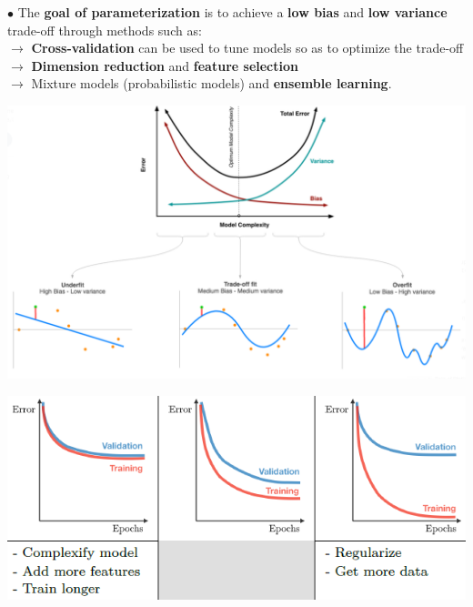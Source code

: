 \documentclass[letterpaper, 10.5pt,landscape]{article}
\begin{document}
\begin{multicols*}{3}
$\bullet$ The \textbf{goal of parameterization} is to achieve a \textbf{low bias} and \textbf{low variance} trade-off through methods such as:\\
$\rightarrow$ \textbf{Cross-validation} can be used to tune models so as to optimize the trade-off \\
$\rightarrow$ \textbf{Dimension reduction} and \textbf{feature selection} \\
$\rightarrow$ Mixture models (probabilistic models) and \textbf{ensemble learning}. \\

\begin{center}
    \begin{minipage}{\linewidth}
        \includegraphics[width=\textwidth]{figures/bias_variance_overfitting_underfitting.PNG}
    \end{minipage}
\end{center}

\vspace{-5mm}

\begin{center}
    \begin{minipage}{0.9\linewidth}
        \includegraphics[width=\textwidth]{figures/bias_variance_overfitting_underfitting_LearningCurves.PNG}
    \end{minipage}
\end{center}



\end{multicols*}
\end{document}
